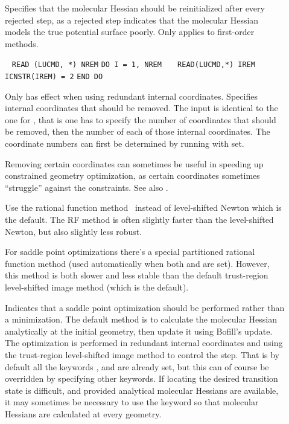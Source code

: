\begin{description}
\item[]
Specifies that the molecular Hessian should be
reinitialized after every
rejected step, as a rejected step
indicates that the molecular Hessian models the
true potential surface poorly. Only applies to first-order
methods.

\item[]\verb| |\newline
\verb|READ (LUCMD, *) NREM|\newline
\verb|DO I = 1, NREM|\newline
\verb|   READ(LUCMD,*) IREM|\newline
\verb|   ICNSTR(IREM) = 2|\newline
\verb|END DO|

Only has effect when using redundant internal coordinates.
Specifies internal coordinates that should be removed. The input is
identical to the one for , that is one has to specify
the number of coordinates that should be removed, then the number of
each of those internal coordinates. The coordinate numbers can first
be determined by running with  set.

Removing certain coordinates can sometimes be useful in speeding up
constrained geometry optimization, as certain coordinates sometimes
``struggle'' against the constraints. See also .

\item[]
Use the rational function method~\cite{abnajsrsjpc89} instead of
level-shifted Newton which is the default. The RF method is often
slightly faster than the level-shifted Newton, but also slightly less
robust.

For saddle point optimizations there's a special partitioned rational
function method (used automatically when both 
and  are set). However, this method is both slower and
less stable than the default trust-region level-shifted image method
(which is the default).

\item[]
Indicates that a saddle point optimization should be performed rather
than a minimization. The default method is to calculate the molecular Hessian
analytically at the initial geometry, then update it using Bofill's
update. The optimization is performed in redundant internal
coordinates and using the trust-region level-shifted image method to
control the step. That is by default all the keywords ,
 and  are already set, but this can of course
be overridden by specifying other keywords. If locating the desired
transition state is difficult, and provided analytical molecular Hessians are
available, it may sometimes be necessary to use the 
keyword so that molecular Hessians are calculated at every geometry.


\end{description}

